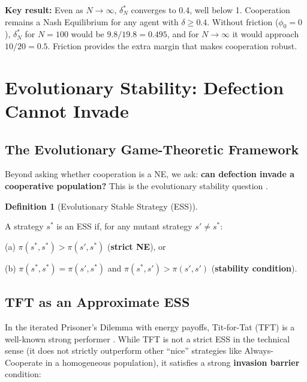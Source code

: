 \documentclass[11pt]{article}
\theoremstyle{plain}
\theoremstyle{definition}
\newtheorem{definition}{Definition}
\theoremstyle{remark}
\let\origsection\section
\renewcommand{\section}{\needspace{12\baselineskip}\origsection}
\let\origsubsection\subsection
\renewcommand{\subsection}{\needspace{7\baselineskip}\origsubsection}
\begin{document}
\textbf{Key result:} Even as \(N \to \infty\), \(\delta_N^*\) converges
to 0.4, well below 1. Cooperation remains a Nash Equilibrium for any
agent with \(\delta \geq 0.4\). Without friction (\(\phi_0 = 0\)),
\(\delta_N^*\) for \(N = 100\) would be \(9.8/19.8 = 0.495\), and for
\(N \to \infty\) it would approach \(10/20 = 0.5\). Friction provides
the extra margin that makes cooperation robust.

\section{Evolutionary Stability: Defection Cannot
Invade}\label{evolutionary-stability-defection-cannot-invade}

\subsection{The Evolutionary Game-Theoretic
Framework}\label{the-evolutionary-game-theoretic-framework}

Beyond asking whether cooperation is a NE, we ask: \textbf{can defection
invade a cooperative population?} This is the evolutionary stability
question \citep{MaynardSmith1973}.

\begin{definition}[Evolutionary Stable Strategy (ESS)]
\label{def-ess}

A strategy $s^*$ is an ESS if, for any mutant strategy $s' \neq s^*$:

(a) $\pi(s^*, s^*) > \pi(s', s^*)$ (\textbf{strict NE}), or

(b) $\pi(s^*, s^*) = \pi(s', s^*)$ and $\pi(s^*, s') > \pi(s', s')$ (\textbf{stability condition}).
\end{definition}

\subsection{TFT as an Approximate ESS}\label{tft-as-an-approximate-ess}

In the iterated Prisoner's Dilemma with energy payoffs, Tit-for-Tat
(TFT) is a well-known strong performer \citep{Axelrod1984}. While TFT is
not a strict ESS in the technical sense (it does not strictly outperform
other ``nice'' strategies like Always-Cooperate in a homogeneous
population), it satisfies a strong \textbf{invasion barrier} condition:
\end{document}
